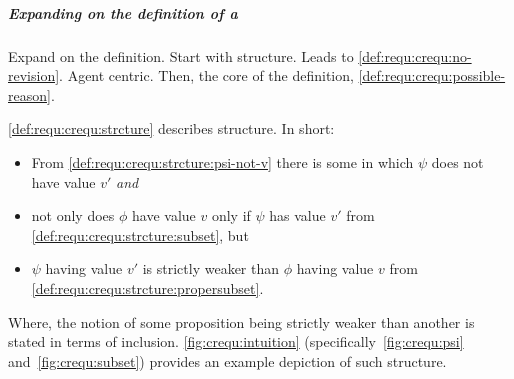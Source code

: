 \subparagraph{Expanding on the definition of a \crequ{}}

\begin{note}
  Expand on the definition.
  Start with structure.
  Leads to \ref{def:requ:crequ:no-revision}.
  Agent centric.
  Then, the core of the definition, \ref{def:requ:crequ:possible-reason}.
\end{note}


\begin{note}
  \ref{def:requ:crequ:strcture} describes structure.
  In short:
  \begin{itemize}
  \item
    From \ref{def:requ:crequ:strcture:psi-not-v} there is some \epVAd{} in which \(\psi\) does not have value \(v'\) \emph{and}
  \item
    not only does \(\phi\) have value \(v\) only if \(\psi\) has value \(v'\) from \ref{def:requ:crequ:strcture:subset}, but
  \item
    \(\psi\) having value \(v'\) is strictly weaker than \(\phi\) having value \(v\) from \ref{def:requ:crequ:strcture:propersubset}.
  \end{itemize}
  Where, the notion of some proposition being strictly weaker than another is stated in terms of inclusion.
  \autoref{fig:crequ:intuition} (specifically~\autoref{fig:crequ:psi} and~\autoref{fig:crequ:subset}) provides an example depiction of such structure.
\end{note}

